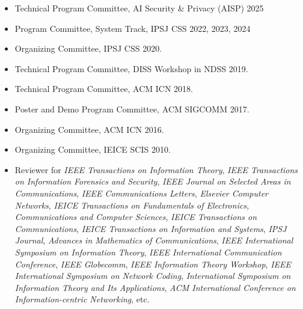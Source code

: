 \begin{itemize}
 \item Technical Program Committee, AI Security \& Privacy (AISP) 2025
 \item Program Committee, System Track, IPSJ CSS 2022, 2023, 2024
 \item Organizing Committee, IPSJ CSS 2020.
 \item Technical Program Committee, DISS Workshop in NDSS 2019.
 \item Technical Program Committee, ACM ICN 2018.
 \item Poster and Demo Program Committee, ACM SIGCOMM 2017.
 \item Organizing Committee, ACM ICN 2016.
 \item Organizing Committee, IEICE SCIS 2010.
 \item Reviewer for
\textit{IEEE Transactions on Information Theory},
\textit{IEEE Transactions on Information Forensics and Security},
\textit{IEEE Journal on Selected Areas in Communications},
\textit{IEEE Communications Letters},
\textit{Elsevier Computer Networks},
\textit{IEICE Transactions on Fundamentals of Electronics, Communications and Computer Sciences},
\textit{IEICE Transactions on Communications},
\textit{IEICE Transactions on Information and Systems},
\textit{IPSJ Journal},
\textit{Advances in Mathematics of Communications},
\textit{IEEE International Symposium on Information Theory},
\textit{IEEE International Communication Conference},
\textit{IEEE Globecomm},
\textit{IEEE Information Theory Workshop},
\textit{IEEE International Symposium on Network Coding},
\textit{International Symposium on Information Theory and Its Applications},
\textit{ACM International Conference on Information-centric Networking},
%
etc.
\end{itemize}
